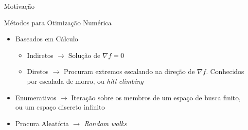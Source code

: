 \begin{frame}{Motivação}
  \begin{block}{Métodos para Otimização Numérica}
    \vfill
    \begin{itemize}
      \item Baseados em Cálculo
            \begin{itemize}
              \item Indiretos $\rightarrow$ Solução de $\nabla f = 0$
              \item Diretos $\rightarrow$ Procuram extremos escalando na direção de $\nabla f$.
                    Conhecidos por escalada de morro, ou \textit{hill climbing}
            \end{itemize}
      \item Enumerativos $\rightarrow$ Iteração sobre os membros de um espaço de busca finito,
            ou um espaço discreto infinito
      \item Procura Aleatória $\rightarrow$ \textit{Random walks}
    \end{itemize}
  \end{block}
\end{frame}


